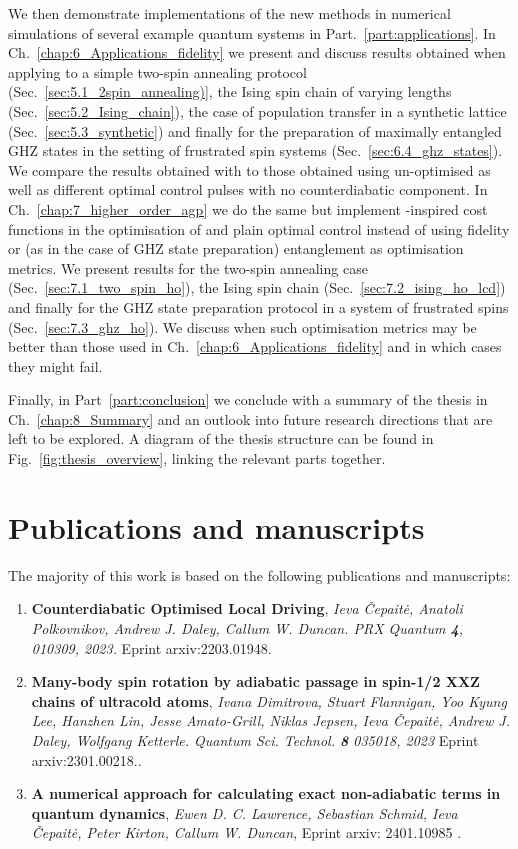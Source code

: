 We then demonstrate implementations of the new methods in numerical simulations of several example quantum systems in Part.~\ref{part:applications}. In Ch.~\ref{chap:6_Applications_fidelity} we present and discuss results obtained when applying  to a simple two-spin annealing protocol (Sec.~\ref{sec:5.1_2spin_annealing)}, the Ising spin chain of varying lengths (Sec.~\ref{sec:5.2_Ising_chain}), the case of population transfer in a synthetic lattice (Sec.~\ref{sec:5.3_synthetic}) and finally for the preparation of maximally entangled GHZ states in the setting of frustrated spin systems (Sec.~\ref{sec:6.4_ghz_states}). We compare the results obtained with  to those obtained using un-optimised  as well as different optimal control pulses with no counterdiabatic component. In Ch.~\ref{chap:7_higher_order_agp} we do the same but implement -inspired cost functions in the optimisation of  and plain optimal control instead of using fidelity or (as in the case of GHZ state preparation) entanglement as optimisation metrics. We present results for the two-spin annealing case (Sec.~\ref{sec:7.1_two_spin_ho}), the Ising spin chain (Sec.~\ref{sec:7.2_ising_ho_lcd}) and finally for the GHZ state preparation protocol in a system of frustrated spins (Sec.~\ref{sec:7.3_ghz_ho}). We discuss when such optimisation metrics may be better than those used in Ch.~\ref{chap:6_Applications_fidelity} and in which cases they might fail.

Finally, in Part~\ref{part:conclusion} we conclude with a summary of the thesis in Ch.~\ref{chap:8_Summary} and an outlook into future research directions that are left to be explored. A diagram of the thesis structure can be found in Fig.~\ref{fig:thesis_overview}, linking the relevant parts together.

\section{Publications and manuscripts}

The majority of this work is based on the following publications and manuscripts:

\begin{enumerate}
    \item \textbf{Counterdiabatic Optimised Local Driving}, \textit{Ieva Čepaitė, Anatoli Polkovnikov, Andrew J. Daley, Callum W. Duncan. PRX Quantum \textbf{4}, 010309, 2023.} Eprint arxiv:2203.01948. \cite{cepaite_counterdiabatic_2023}
    \item \textbf{Many-body spin rotation by adiabatic passage in
    spin-1/2 XXZ chains of ultracold atoms}, \textit{Ivana Dimitrova, Stuart Flannigan, Yoo Kyung Lee, Hanzhen Lin,  Jesse Amato-Grill, Niklas Jepsen, Ieva Čepaitė, Andrew J. Daley, Wolfgang Ketterle. Quantum Sci. Technol. \textbf{8} 035018, 2023} Eprint arxiv:2301.00218.\cite{dimitrova_many-body_2023}.
    \item \textbf{A numerical approach for calculating exact non-adiabatic terms in quantum dynamics}, \textit{Ewen D. C. Lawrence, Sebastian Schmid, Ieva Čepaitė, Peter Kirton, Callum W. Duncan}, Eprint arxiv: 2401.10985 \cite{lawrence_numerical_2024}.
\end{enumerate}

